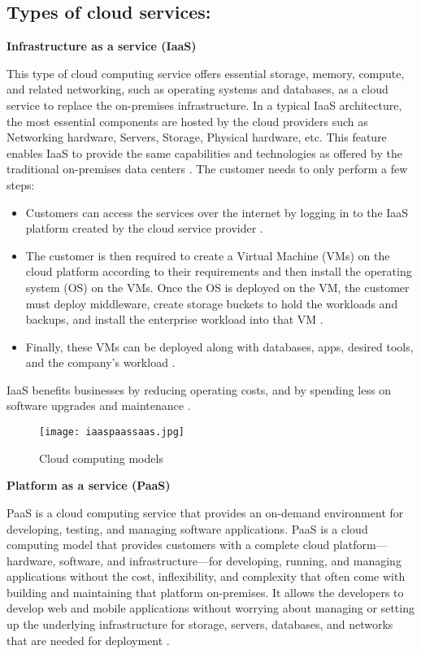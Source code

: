\subsection{Types of cloud services:}
\textbf{Infrastructure as a service (IaaS)}
\par This type of cloud computing service offers
essential storage, memory, compute, and related networking, such as
operating systems and databases, as a cloud service to replace the on-premises infrastructure.
In a typical IaaS
architecture, the most essential components are hosted by the cloud providers such as Networking hardware, Servers, Storage, Physical hardware, etc. This feature enables IaaS to provide the same capabilities and technologies as offered by the traditional on-premises data centers \cite{9}. The customer needs to only perform a few steps:
\begin{itemize}
    \item Customers can access the services over the internet by logging in to the IaaS platform created by the cloud
    service provider \cite{15}.
\end{itemize}
\begin{itemize}
    \item The customer is then required to create a Virtual
    Machine (VMs) on the cloud platform according to their
    requirements and then install the operating system
    (OS) on the VMs. Once the OS is deployed on the VM,
    the customer must deploy middleware, create
    storage buckets to hold the workloads and backups, and
    install the enterprise workload into that VM \cite{15}.
\end{itemize}
\begin{itemize}
    \item Finally, these VMs can be deployed along with databases, apps, desired tools, and the company’s workload \cite{15}.
\end{itemize}
IaaS benefits businesses by reducing operating costs, and by spending less on software upgrades and maintenance
\cite{15}.

\begin{figure}
    \centering
    \texttt{[image: iaaspaassaas.jpg]}
    \caption{Cloud computing models}
    \label{fig:iaaspaassaas}
\end{figure}

\clearpage
\textbf{Platform as a service (PaaS)}
\par PaaS is a cloud computing service that provides an on-demand environment for developing, testing, and managing software applications. PaaS is a cloud computing model that provides customers with a complete cloud platform—hardware, software, and infrastructure—for developing, running, and managing applications without the cost, inflexibility, and complexity that often come with building and maintaining that platform on-premises. It allows the developers to develop web and mobile applications without worrying about managing or setting up the underlying infrastructure for storage, servers, databases, and networks that are needed for deployment \cite{15}.

